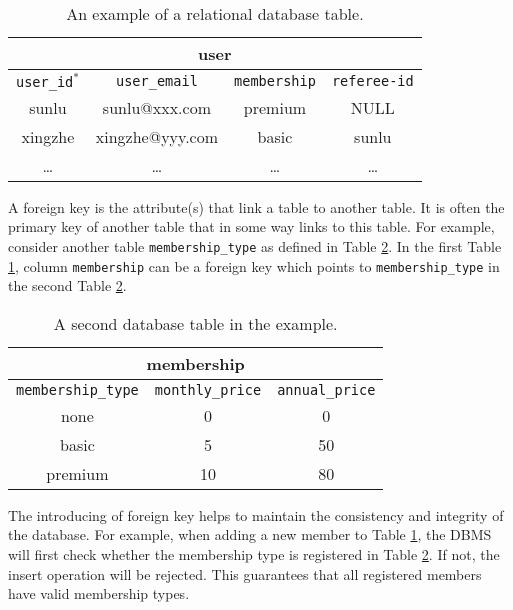 \begin{table}
	\centering \caption{An example of a relational database table.} \label{ch:db:tab:relationaldbexample}
	\begin{tabular}{|c|c|c|c|}
		\hline
        \multicolumn{4}{|c|}{user} \\ \hline
		\verb|user_id|$^*$ & \verb|user_email| & \verb|membership| & \verb|referee-id| \\ \hline
        sunlu & sunlu@xxx.com & premium & NULL \\ \hline
        xingzhe & xingzhe@yyy.com & basic & sunlu \\ \hline
        \ldots & \ldots & \ldots & \ldots \\ \hline
	\end{tabular}
\end{table}

A foreign key is the attribute(s) that link a table to another table. It is often the primary key of another table that in some way links to this table. For example, consider another table \verb|membership_type| as defined in Table \ref{ch:db:tab:relationaldbexampleanother}. In the first Table \ref{ch:db:tab:relationaldbexample}, column \verb|membership| can be a foreign key which points to \verb|membership_type| in the second Table \ref{ch:db:tab:relationaldbexampleanother}.

\begin{table}
	\centering \caption{A second database table in the example.} \label{ch:db:tab:relationaldbexampleanother}
	\begin{tabular}{|c|c|c|}
		\hline
        \multicolumn{3}{|c|}{membership} \\ \hline
		\verb|membership_type| & \verb|monthly_price| & \verb|annual_price| \\ \hline
        none & 0 & 0 \\ \hline
        basic & 5 & 50 \\ \hline
        premium & 10 & 80 \\ \hline
	\end{tabular}
\end{table}

The introducing of foreign key helps to maintain the consistency and integrity of the database. For example, when adding a new member to Table \ref{ch:db:tab:relationaldbexample}, the DBMS will first check whether the membership type is registered in Table \ref{ch:db:tab:relationaldbexampleanother}. If not, the insert operation will be rejected. This guarantees that all registered members have valid membership types.

